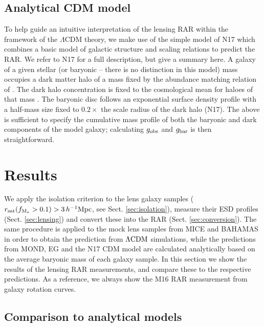 \documentclass[usenatbib]{mnras}
\newcommand{\hMpc}{\, h^{-1}{\rm{Mpc}} }
\newcommand{\lcdm}{{\rm \Lambda CDM}}
\newcommand{\un}[1]{_{\rm #1}}
\begin{document}
\subsection{Analytical CDM model}
\label{sec:analytical}

To help guide an intuitive interpretation of the lensing RAR within the framework of the $\Lambda$CDM theory, we make use of the simple model of N17 which combines a basic model of galactic structure and scaling relations to predict the RAR. We refer to N17 for a full description, but give a summary here. A galaxy of a given stellar (or baryonic -- there is no distinction in this model)  mass occupies a dark matter halo of a mass fixed by the abundance matching relation of \citet{Behroozi13}. The dark halo concentration is fixed to the cosmological mean for haloes of that mass \citep{Ludlow14}. The baryonic disc follows an exponential surface density profile with a half-mass size fixed to $0.2\times$ the scale radius of the dark halo (N17). The above is sufficient to specify the cumulative mass profile of both the baryonic and dark components of the model galaxy; calculating $g_{\rm obs}$ and $g_{\rm bar}$ is then straightforward.

\section{Results}
\label{sec:results}

We apply the isolation criterion to the lens galaxy samples (\mbox{$r\un{sat}(f\un{M_*}>0.1)>3\hMpc$}, see Sect. \ref{sec:isolation}), measure their ESD profiles (Sect. \ref{sec:lensing}) and convert these into the RAR (Sect. \ref{sec:conversion}). The same procedure is applied to the mock lens samples from MICE and BAHAMAS in order to obtain the prediction from $\lcdm$ simulations, while the predictions from MOND, EG and the N17 CDM model are calculated analytically based on the average baryonic mass of each galaxy sample. In this section we show the results of the lensing RAR measurements, and compare these to the respective predictions. As a reference, we always show the M16 RAR measurement from galaxy rotation curves.

\subsection{Comparison to analytical models}
\end{document}
